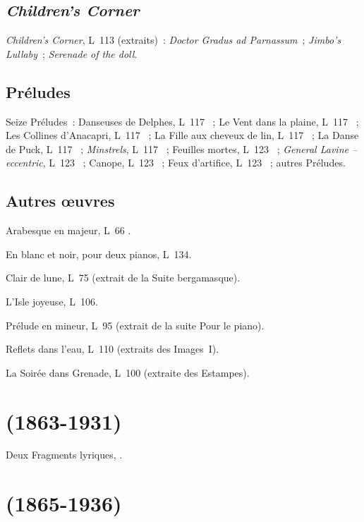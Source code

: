 \subsection{\emph{Children's Corner}}

\emph{Children's Corner}, L~113 (extraits)~:  \emph{Doctor Gradus
ad Parnassum}~;  \emph{Jimbo's Lullaby}~; 
\emph{Serenade of the doll}.

\subsection{Préludes}

Seize Préludes~: Danseuses de Delphes, L~117 ~; Le Vent dans la
plaine, L~117 ~; Les Collines d'\hbox{Anacapri}, L~117
~; La Fille aux cheveux de lin, L~117 ~; La Danse de
Puck, L~117 ~; \emph{Minstrels}, L~117 ~; Feuilles
mortes, L~123 ~; \emph{General Lavine -- eccentric}, L~123
~; Canope, L~123 ~; Feux d'artifice, L~123
~; autres Préludes.

\subsection{Autres œuvres}

Arabesque  en \kE majeur, L~66 .

En blanc et noir, pour deux pianos, L~134.

Clair de lune, L~75  (extrait de la Suite bergamasque).

L'\hbox{Isle} joyeuse, L~106.

Prélude en \kA mineur, L~95  (extrait de la suite Pour le piano).

Reflets dans l'eau, L~110  (extraits des Images~I).

La Soirée dans Grenade, L~100  (extraite des Estampes).

\section[%
Feliks Blumenfel'd (1863-1931)]{%
\FBlumenfeld{} (1863-1931)}

Deux Fragments lyriques, .

\section[%
Aleksandr Glazunov (1865-1936)]{%
\AGlazounov{} (1865-1936)}

